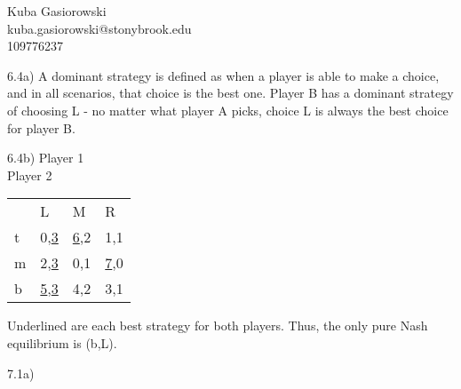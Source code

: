 \documentclass[12pt]{article}
\newcommand\tab[1][1cm]{\hspace*{#1}}
\begin{document}
	
	
	Kuba Gasiorowski \\
	kuba.gasiorowski@stonybrook.edu \\
	109776237
	
	6.4a) A dominant strategy is defined as when a player is able to make a choice, and in all scenarios, that choice is the best one.
	Player B has a dominant strategy of choosing L - no matter what player A picks, choice L is always the best choice for player B.
	
	6.4b) \hspace{3.2cm}Player 1\\
		\tab{}Player 2\hspace{.3cm}\begin{tabular}{llll}
		& L & M & R \\ \cline{2-4} 
		\multicolumn{1}{l|}{t} & \multicolumn{1}{l|}{0,\uline{3}} & \multicolumn{1}{l|}{\uline{6},2} & \multicolumn{1}{l|}{1,1} \\ \cline{2-4} 
		
		\multicolumn{1}{l|}{m} & \multicolumn{1}{l|}{2,\uline{3}} & \multicolumn{1}{l|}{0,1} & \multicolumn{1}{l|}{\uline{7},0} \\ \cline{2-4} 
		
		\multicolumn{1}{l|}{b} & \multicolumn{1}{l|}{\uline{5},\uline{3}} & \multicolumn{1}{l|}{4,2} & \multicolumn{1}{l|}{3,1} \\ \cline{2-4} 
	\end{tabular}
	
	Underlined are each best strategy for both players. Thus, the only pure Nash equilibrium is (b,L).
	
	7.1a)
	
\end{document}

